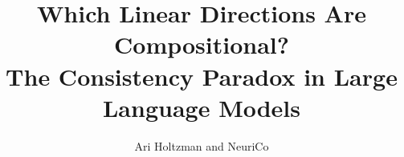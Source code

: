\documentclass{article}
\title{Which Linear Directions Are Compositional? \\ The Consistency Paradox in Large Language Models}
\author{Ari Holtzman and NeuriCo}
\begin{document}
\maketitle

\begin{abstract}

\end{abstract}









\end{document}
